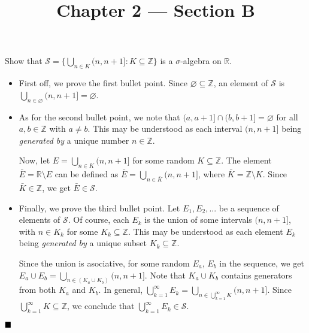 \documentclass[11pt, a4paper, tikz]{article}
\newcommand{\centsection}[1]{
	\section*{\centering{#1}}
}
\renewcommand{\qed}{\hfill\blacksquare}
\newcommand{\Bigcup}[2]{\displaystyle \bigcup_{#1}^{#2}}
\newcommand{\integers}{
	\ensuremath{\mathbb{Z}}
}
\newcommand{\reals}{
	\ensuremath{\mathbb{R}}
}
\newcommand{\sigmaAlgebra}[1]{
	\ensuremath{\mathcal{#1}}
}
\begin{document}
	\title{\textbf{Chapter 2 — Section B}}
	\maketitle
	\centsection{Exercise 1}
	
	\begin{formulationBox}
		Show that $\sigmaAlgebra{S} = \{\bigcup_{n\in K}(n, n+1]:K\subseteq\integers\}$ is a $\sigma$-algebra on $\reals$.
	\end{formulationBox}

	\begin{itemize}
	\item First off, we prove the first bullet point. Since $\varnothing\subseteq\integers$, an element of $\sigmaAlgebra{S}$ is $\bigcup_{n\in\varnothing}(n, n+1] = \varnothing$.
	
	\item As for the second bullet point, we note that $(a, a+1]\cap(b, b+1] = \varnothing$ for all $a,b\in\integers$ with $a\neq b$. This may be understood as each interval $(n, n+1]$ being \textit{generated by} a unique number $n\in\integers$.
	
	Now, let $E = \bigcup_{n\in K}(n, n+1]$ for some random $K\subseteq\integers$. The element $\bar{E} = \reals\setminus E$ can be defined as $\bar{E} = \bigcup_{n\in \bar{K}}(n, n+1]$, where $\bar{K} = \integers\setminus K$. Since $\bar{K}\in\integers$, we get $\bar{E}\in\sigmaAlgebra{S}$.
	
	\item Finally, we prove the third bullet point. Let $E_1, E_2, ...$ be a sequence of elements of $\sigmaAlgebra{S}$. Of course, each $E_k$ is the union of some intervals $(n, n+1]$, with $n\in K_k$ for some $K_k\subseteq\integers$. This may be understood as each element $E_k$ being \textit{generated by} a unique subset $K_k\subseteq\integers$.
	
	Since the union is asociative, for some random $E_a$, $E_b$ in the sequence, we get $E_a\cup E_b = \bigcup_{n\in(K_a\cup K_b)}(n, n+1]$. Note that $K_a\cup K_b$ contains generators from both $K_a$ and $K_b$. In general, $\Bigcup{k=1}{\infty}E_k = \bigcup_{n\in\bigcup_{k=1}^{\infty}K}(n, n+1]$. Since $\bigcup_{k=1}^{\infty}K \subseteq \integers$, we conclude that $\bigcup_{k=1}^{\infty}E_k \in \sigmaAlgebra{S}$.
	
	\end{itemize}
	
	$\qed$
\end{document}
